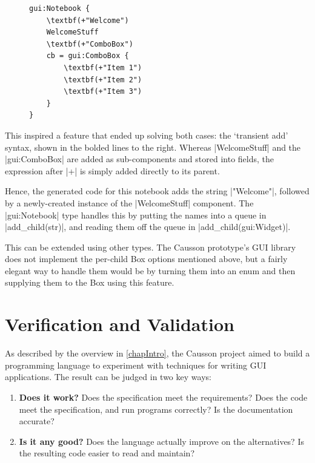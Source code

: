 \documentclass[11pt]{report}
\begin{document}
\begin{figure}
\vspace{-0.5cm}
\begin{Verbatim}[commandchars=\\()]
gui:Notebook {
    \textbf(+"Welcome")
    WelcomeStuff
    \textbf(+"ComboBox")
    cb = gui:ComboBox {
        \textbf(+"Item 1")
        \textbf(+"Item 2")
        \textbf(+"Item 3")
    }
}
\end{Verbatim}
\end{figure}

This inspired a feature that ended up solving both cases: the `transient add' syntax, shown in the bolded lines to the right. Whereas |WelcomeStuff| and the |gui:ComboBox| are added as sub-components and stored into fields, the expression after |+| is simply added directly to its parent.

Hence, the generated code for this notebook adds the string |"Welcome"|, followed by a newly-created instance of the |WelcomeStuff| component. The |gui:Notebook| type handles this by putting the names into a queue in |add_child(str)|, and reading them off the queue in |add_child(gui:Widget)|.

This can be extended using other types. The Causson prototype's GUI library does not implement the per-child Box options mentioned above, but a fairly elegant way to handle them would be by turning them into an enum and then supplying them to the Box using this feature.

\chapter{Verification and Validation} \label{chapTesting}

As described by the overview in \cref{chapIntro}, the Causson project aimed to build a programming language to experiment with techniques for writing GUI applications. The result can be judged in two key ways:

\begin{enumerate}
    \item \textbf{Does it work?} Does the specification meet the requirements? Does the code meet the specification, and run programs correctly? Is the documentation accurate?
    
    \item \textbf{Is it any good?} Does the language actually improve on the alternatives? Is the resulting code easier to read and maintain?
\end{enumerate}
\end{document}
